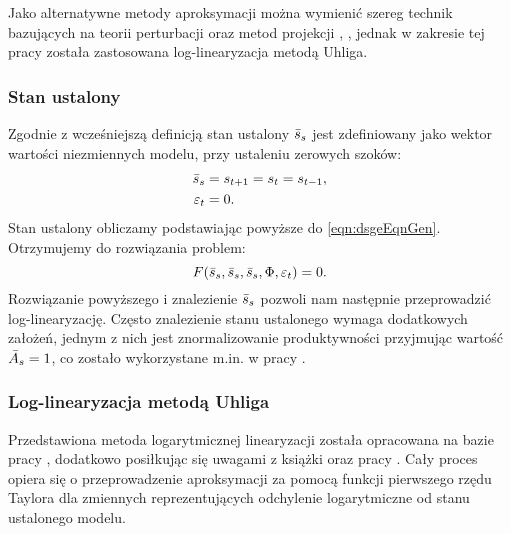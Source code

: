 Jako alternatywne metody aproksymacji można wymienić szereg technik bazujących na teorii perturbacji oraz metod projekcji \cite{rubioRamirez}, \cite{FERNANDEZVILLAVERDE2016527}, jednak w zakresie tej pracy została zastosowana log-linearyzacja metodą Uhliga.

\subsubsection{Stan ustalony}
\label{sec:steady_state}

Zgodnie z wcześniejszą definicją stan ustalony $\bar{s}_s$ jest zdefiniowany jako wektor wartości niezmiennych modelu, przy ustaleniu zerowych szoków:
\begin{align}
    \bar{s}_s &= s_{t+1} = s_{t} = s_{t-1},\\
    \varepsilon_t &= 0.
\end{align}
Stan ustalony obliczamy podstawiając powyższe do \eqref{eqn:dsgeEqnGen}. Otrzymujemy do rozwiązania problem:
\begin{equation}
    \label{eqn:steadyDsgeEqnGen}
    F(\bar{s}_s, \bar{s}_s, \bar{s}_s, \Phi, \varepsilon_t) = 0.
\end{equation}
Rozwiązanie powyższego i znalezienie $\bar{s}_s$ pozwoli nam następnie przeprowadzić log-linearyzację. Często znalezienie stanu ustalonego wymaga dodatkowych założeń, jednym z nich jest znormalizowanie produktywności przyjmując wartość $\bar{A}_s = 1$, co zostało wykorzystane m.in. w pracy \cite{costaBook}.

\subsubsection{Log-linearyzacja metodą Uhliga}

Przedstawiona metoda logarytmicznej linearyzacji została opracowana na bazie pracy \cite{uhlig:1995}, dodatkowo posiłkując się uwagami z książki \cite{costaBook} oraz pracy \cite{logLinearization}. Cały proces opiera się o przeprowadzenie aproksymacji za pomocą funkcji pierwszego rzędu Taylora dla zmiennych reprezentujących odchylenie logarytmiczne od stanu ustalonego modelu.

